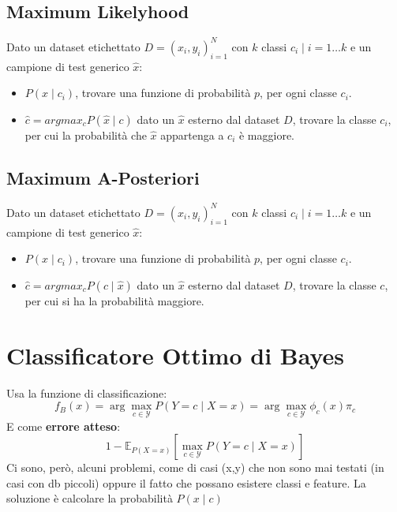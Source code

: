 \subsection{Maximum Likelyhood}
Dato un dataset etichettato $D = (x_i, y_i)_{i=1}^{N}$ con $k$ classi $c_i \mid i = 1 \dots k$ e un campione di test generico $\hat{x}$:
\begin{ex}[Approccio]
  \begin{itemize}
    \item $P(x \mid c_i)$, trovare una funzione di probabilità $p$, per ogni classe $c_i$.
    \item $\hat{c} = argmax_c P(\hat{x} \mid c)$ dato un $\hat{x}$ esterno dal dataset $D$, trovare la classe $c_i$, per cui la probabilità che $\hat{x}$ appartenga a $c_i$ è maggiore.
  \end{itemize}
\end{ex}

\subsection{Maximum A-Posteriori}
Dato un dataset etichettato $D = (x_i, y_i)_{i=1}^{N}$ con $k$ classi $c_i \mid i = 1 \dots k$ e un campione di test generico $\hat{x}$:
\begin{ex}[Approccio]
  \begin{itemize}
    \item $P(x \mid c_i)$, trovare una funzione di probabilità $p$, per ogni classe $c_i$.
    \item $\hat{c} = argmax_c P(c \mid \hat{x})$ dato un $\hat{x}$ esterno dal dataset $D$, trovare la classe $c$, per cui si ha la probabilità maggiore. 
  \end{itemize}
\end{ex}

\section{Classificatore Ottimo di Bayes}
Usa la funzione di classificazione:
\[
  f_B(x) = \arg\max_{c \in \mathcal{Y}} P(Y = c \mid X = x) = \arg\max_{c \in \mathcal{Y}} \phi_c(x) \pi_c
\]
E come \textbf{errore atteso}:
\[
  1 - \mathbb{E}_{P(X=x)} \left[ \max_{c \in \mathcal{Y}} P(Y = c \mid X = x) \right]
\]
Ci sono, però, alcuni problemi, come di casi (x,y) che non sono mai testati (in casi con db piccoli) oppure il fatto che possano esistere classi e feature.
La soluzione è calcolare la probabilità $P(x \mid c)$

